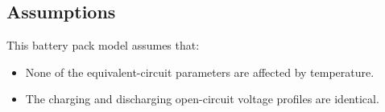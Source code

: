 \documentclass[../SimBALink.tex]{subfiles}
\begin{document}
\subsection{Assumptions}
	This battery pack model assumes that:
	
	\begin{itemize}
		\item		None of the equivalent-circuit parameters are affected by temperature.		
		\item		The charging and discharging open-circuit voltage profiles are identical.	
	\end{itemize}	
\end{document}
